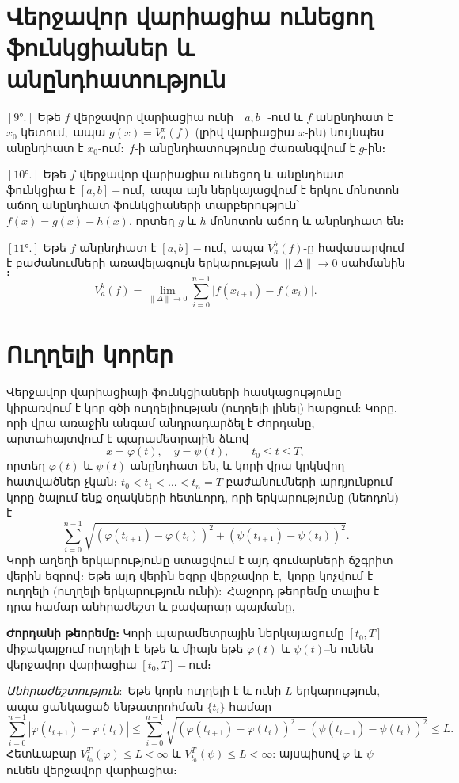 \documentclass[12pt]{article}
\begin{document}
\section{Վերջավոր վարիացիա ունեցող ֆունկցիաներ և անընդհատություն}
\begin{description}
\item\([9°.]\) Եթե \(f\) վերջավոր վարիացիա ունի \([a,b]\)-ում և \(f\) անընդհատ է \(x_0\) կետում\(,\) ապա \(g(x)=V_a^x(f)\) (լրիվ վարիացիա \(x\)-ին) նույնպես անընդհատ է \(x_0\)-ում\(:\) \(f\)-ի անընդհատությունը ժառանգվում է \(g\)-ին։
\item\([10°.]\) Եթե \(f\) վերջավոր վարիացիա ունեցող և անընդհատ ֆունկցիա է \([a,b]-\)ում\(,\) ապա այն ներկայացվում է երկու մոնոտոն աճող անընդհատ ֆունկցիաների տարբերություն՝ \(f(x) = g(x)-h(x)\), որտեղ \(g\) և \(h\) մոնոտոն աճող և անընդհատ են։
\item\([11°.]\) Եթե \(f\) անընդհատ է \([a,b]-\)ում\(,\) ապա \(V_a^b(f)\)-ը հավասարվում է բաժանումների առավելագույն երկարության \(\|\Delta\|\to0\) սահմանին\(։\)
\[
V_a^b(f) = \lim_{\|\Delta\|\to0} \sum_{i=0}^{n-1}\bigl|f(x_{i+1}) - f(x_i)\bigr|.
\]
\end{description}

\section{Ուղղելի կորեր}
Վերջավոր վարիացիայի ֆունկցիաների հասկացությունը կիրառվում է կոր գծի ուղղելիության (ուղղելի լինել) հարցում: Կորը, որի վրա առաջին անգամ անդրադարձել է Ժորդանը, արտահայտվում է պարամետրային ձևով
\begin{equation}\label{eq:curve-param}
x = \varphi(t),\quad y = \psi(t),\qquad t_0 \le t \le T,
\end{equation}
որտեղ \(\varphi(t)\) և \(\psi(t)\) անընդհատ են, և կորի վրա կրկնվող հատվածներ չկան։ \(t_0 < t_1 < \dots < t_n=T\) բաժանումների արդյունքում կորը ծալում ենք օղակների հետևորդ, որի երկարությունը (նեոդոն) է
\[
\sum_{i=0}^{n-1} \sqrt{(\varphi(t_{i+1})-\varphi(t_i))^2 + (\psi(t_{i+1})-\psi(t_i))^2}.
\]
Կորի աղեղի երկարությունը ստացվում է այդ գումարների ճշգրիտ վերին եզրով։ Եթե այդ վերին եզրը վերջավոր է\(,\) կորը կոչվում է ուղղելի \((\)ուղղելի երկարություն ունի\():\) Հաջորդ թեորեմը տալիս է դրա համար անհրաժեշտ և բավարար պայմանը\(,\)

\textbf{Ժորդանի թեորեմը։} Կորի պարամետրային ներկայացումը \([t_0,T]\) միջակայքում ուղղելի է եթե և միայն եթե \(\varphi(t)\) և \(\psi(t)\)–ն ունեն վերջավոր վարիացիա \([t_0,T]-\)ում։

\textit{Անհրաժեշտություն\(:\)} Եթե կորն ուղղելի է և ունի \(L\) երկարություն\(,\) ապա ցանկացած ենթատրոհման \(\{t_i\}\) համար
\[
\sum_{i=0}^{n-1}|\varphi(t_{i+1})-\varphi(t_i)|
\le \sum_{i=0}^{n-1}\sqrt{(\varphi(t_{i+1})-\varphi(t_i))^2+(\psi(t_{i+1})-\psi(t_i))^2} \le L.
\]
Հետևաբար \(V_{t_0}^{T}(\varphi)\le L<\infty\) և \(V_{t_0}^{T}(\psi)\le L<\infty\): այսպիսով \(\varphi\) և \(\psi\) ունեն վերջավոր վարիացիա։
\end{document}

